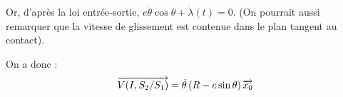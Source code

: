 \documentclass[10pt,oneside]{article}
\begin{document}
Or, d'après la loi entrée-sortie, $e\dot{\theta}\cos \theta +\dot{\lambda}(t)  = 0$. (On pourrait aussi remarquer que la vitesse de glissement est contenue dans le plan tangent au contact).

On a donc :
$$
\overrightarrow{V(I,S_2/S_1)} 
= \dot{\theta}\left(R - e\sin\theta \right) \overrightarrow{x_0} 
$$

%
%
%
%
%
\end{document}
